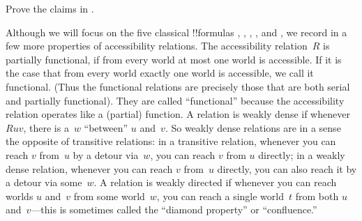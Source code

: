 \documentclass[../../../include/open-logic-section]{subfiles}
\begin{document}
\begin{prob}
  Prove the claims in .
\end{prob}

Although we will focus on the five classical !!{formula}s ,
, , , and , we record in
 a few more properties of accessibility
relations. The accessibility relation~$R$ is partially functional, if
from every world at most one world is accessible. If it is the case
that from every world exactly one world is accessible, we call it
functional. (Thus the functional relations are precisely those that
are both serial and partially functional). They are called
``functional'' because the accessibility relation operates like a
(partial) function. A relation is weakly dense if whenever $Ruv$,
there is a~$w$ ``between'' $u$ and~$v$. So weakly dense relations are
in a sense the opposite of transitive relations: in a transitive
relation, whenever you can reach $v$ from~$u$ by a detour via~$w$, you
can reach $v$ from $u$ directly; in a weakly dense relation, whenever
you can reach $v$ from~$u$ directly, you can also reach it by a detour
via some~$w$. A relation is weakly directed if whenever you can reach
worlds $u$ and~$v$ from some world~$w$, you can reach a single
world~$t$ from both $u$ and~$v$---this is sometimes called the
``diamond property'' or ``confluence.''
\end{document}

